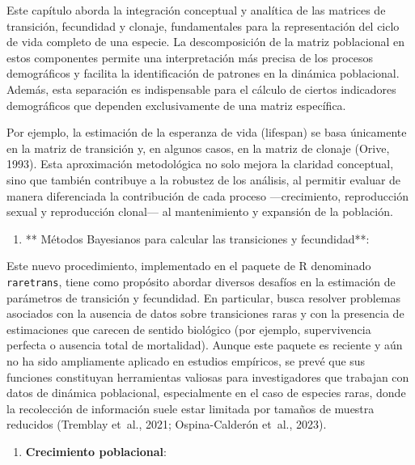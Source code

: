 \documentclass[
  12pt,
  letterpaper,
]{book}
\providecommand{\tightlist}{%
  \setlength{\itemsep}{0pt}\setlength{\parskip}{0pt}}\usepackage{longtable,booktabs,array}
\begin{document}
Este capítulo aborda la integración conceptual y analítica de las
matrices de transición, fecundidad y clonaje, fundamentales para la
representación del ciclo de vida completo de una especie. La
descomposición de la matriz poblacional en estos componentes permite una
interpretación más precisa de los procesos demográficos y facilita la
identificación de patrones en la dinámica poblacional. Además, esta
separación es indispensable para el cálculo de ciertos indicadores
demográficos que dependen exclusivamente de una matriz específica.

Por ejemplo, la estimación de la esperanza de vida (lifespan) se basa
únicamente en la matriz de transición y, en algunos casos, en la matriz
de clonaje (Orive, 1993). Esta aproximación metodológica no solo mejora
la claridad conceptual, sino que también contribuye a la robustez de los
análisis, al permitir evaluar de manera diferenciada la contribución de
cada proceso ---crecimiento, reproducción sexual y reproducción
clonal--- al mantenimiento y expansión de la población.

\begin{enumerate}
\def\labelenumi{\arabic{enumi}.}
\setcounter{enumi}{5}
\tightlist
\item
  ** Métodos Bayesianos para calcular las transiciones y fecundidad**:
\end{enumerate}

Este nuevo procedimiento, implementado en el paquete de R denominado
\texttt{raretrans}, tiene como propósito abordar diversos desafíos en la
estimación de parámetros de transición y fecundidad. En particular,
busca resolver problemas asociados con la ausencia de datos sobre
transiciones raras y con la presencia de estimaciones que carecen de
sentido biológico (por ejemplo, supervivencia perfecta o ausencia total
de mortalidad). Aunque este paquete es reciente y aún no ha sido
ampliamente aplicado en estudios empíricos, se prevé que sus funciones
constituyan herramientas valiosas para investigadores que trabajan con
datos de dinámica poblacional, especialmente en el caso de especies
raras, donde la recolección de información suele estar limitada por
tamaños de muestra reducidos (Tremblay et~al., 2021; Ospina-Calderón
et~al., 2023).

\begin{enumerate}
\def\labelenumi{\arabic{enumi}.}
\setcounter{enumi}{6}
\tightlist
\item
  \textbf{Crecimiento poblacional}:
\end{enumerate}
\end{document}
